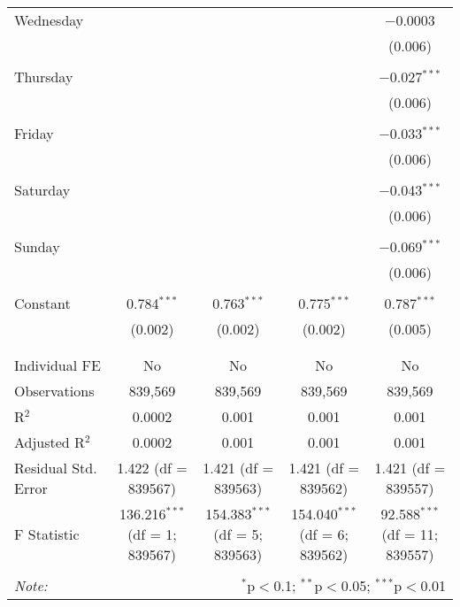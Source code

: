 \documentclass[
]{article}
\begin{document}
\begin{table}[!htbp]
{\begin{tabular}{@{\extracolsep{5pt}}lcccc}
 Wednesday &  &  &  & $-$0.0003 \\ 
  &  &  &  & (0.006) \\ 
  & & & & \\ 
 Thursday &  &  &  & $-$0.027$^{***}$ \\ 
  &  &  &  & (0.006) \\ 
  & & & & \\ 
 Friday &  &  &  & $-$0.033$^{***}$ \\ 
  &  &  &  & (0.006) \\ 
  & & & & \\ 
 Saturday &  &  &  & $-$0.043$^{***}$ \\ 
  &  &  &  & (0.006) \\ 
  & & & & \\ 
 Sunday &  &  &  & $-$0.069$^{***}$ \\ 
  &  &  &  & (0.006) \\ 
  & & & & \\ 
 Constant & 0.784$^{***}$ & 0.763$^{***}$ & 0.775$^{***}$ & 0.787$^{***}$ \\ 
  & (0.002) & (0.002) & (0.002) & (0.005) \\ 
  & & & & \\ 
\hline \\[-1.8ex] 
Individual FE & No & No & No & No \\ 
Observations & 839,569 & 839,569 & 839,569 & 839,569 \\ 
R$^{2}$ & 0.0002 & 0.001 & 0.001 & 0.001 \\ 
Adjusted R$^{2}$ & 0.0002 & 0.001 & 0.001 & 0.001 \\ 
Residual Std. Error & 1.422 (df = 839567) & 1.421 (df = 839563) & 1.421 (df = 839562) & 1.421 (df = 839557) \\ 
F Statistic & 136.216$^{***}$ (df = 1; 839567) & 154.383$^{***}$ (df = 5; 839563) & 154.040$^{***}$ (df = 6; 839562) & 92.588$^{***}$ (df = 11; 839557) \\ 
\hline 
\hline \\[-1.8ex] 
\textit{Note:}  & \multicolumn{4}{r}{$^{*}$p$<$0.1; $^{**}$p$<$0.05; $^{***}$p$<$0.01} \\ 
\end{tabular}
} 
\end{table} 
\newpage
\end{document}
